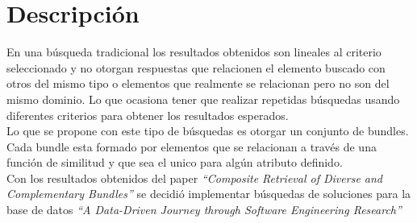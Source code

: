 \section{Descripción}
{\begin{small}%
\begin{flushright}%
\it
\end{flushright}%
\end{small}%
\vspace{.5cm}}
En una búsqueda tradicional los resultados obtenidos son lineales al criterio seleccionado y no 
otorgan respuestas que relacionen el elemento buscado con otros del mismo tipo o elementos 
que realmente se relacionan pero no son del mismo dominio. Lo que ocasiona tener que realizar 
repetidas búsquedas usando diferentes criterios para obtener los resultados esperados.\\
Lo que se propone con este tipo de búsquedas es otorgar un conjunto de bundles. Cada bundle 
esta formado por elementos que se relacionan a través de una función de similitud y que sea el unico 
para algún atributo definido.\\
Con los resultados obtenidos del paper \textit{\textquotedblleft Composite Retrieval of Diverse 
and Complementary Bundles\textquotedblright} se decidió implementar búsquedas de soluciones para la 
base de datos \textit{\textquotedblleft A Data-Driven Journey through Software 
Engineering Research\textquotedblright} \label{int:baseDeDatos}
